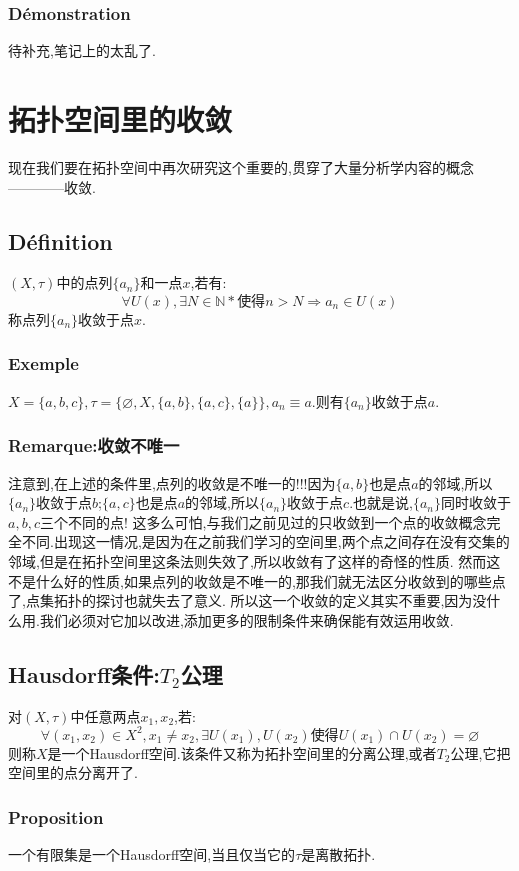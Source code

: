 \documentclass[12pt, a4paper, oneside]{ctexbook}
\begin{document}
  \subsubsection{Démonstration}
  待补充,笔记上的太乱了.




\section{拓扑空间里的收敛 }
  现在我们要在拓扑空间中再次研究这个重要的,贯穿了大量分析学内容的概念————收敛.
  \subsection{Définition}
  $(X,\tau)$中的点列$\{a_n\}$和一点$x$,若有:
  $$
  \forall U(x), \exists N\in \mathbb{N}*\text{使得}n>N\Rightarrow a_n\in U(x)
  $$
  称点列$\{a_n\}$收敛于点$x$.
  \subsubsection{Exemple}
  $X=\{a,b,c\},\tau =\{\varnothing, X, \{a,b\}, \{a,c\}, \{a\}\},a_n\equiv a$.则有$\{a_n\}$收敛于点$a$.
  \subsubsection{Remarque:收敛不唯一}
  注意到,在上述的条件里,点列的收敛是不唯一的!!!因为$\{a,b\}$也是点$a$的邻域,所以$\{a_n\}$收敛于点$b$;$\{a,c\}$也是点$a$的邻域,所以$\{a_n\}$收敛于点$c$.也就是说,$\{a_n\}$同时收敛于$a,b,c$三个不同的点!
  这多么可怕,与我们之前见过的只收敛到一个点的收敛概念完全不同.出现这一情况,是因为在之前我们学习的空间里,两个点之间存在没有交集的邻域,但是在拓扑空间里这条法则失效了,所以收敛有了这样的奇怪的性质.
  然而这不是什么好的性质,如果点列的收敛是不唯一的,那我们就无法区分收敛到的哪些点了,点集拓扑的探讨也就失去了意义.
  所以这一个收敛的定义其实不重要,因为没什么用.我们必须对它加以改进,添加更多的限制条件来确保能有效运用收敛.
  \subsection{Hausdorff条件:$T_2$公理}
  对$(X,\tau)$中任意两点$x_1,x_2$,若:
  $$
    \forall(x_1,x_2)\in X^2, x_1\neq x_2, \exists U(x_1),U(x_2)\text{使得}U(x_1)\cap U(x_2)=\varnothing
  $$
  则称$X$是一个Hausdorff空间.该条件又称为拓扑空间里的分离公理,或者$T_2$公理,它把空间里的点分离开了.
  \subsubsection{Proposition}
  一个有限集是一个Hausdorff空间,当且仅当它的$\tau$是离散拓扑.
\end{document}
